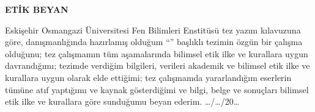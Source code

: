 \begin{center}
\Large\textbf{ETİK BEYAN}
\end{center}
\normalsize
\vspace{3cm}
\thispagestyle{empty}
Eskişehir Osmangazi Üniversitesi Fen Bilimleri Enstitüsü tez yazım kılavuzuna göre, \danisman\space danışmanlığında hazırlamış olduğum “\textbf{\tbaslik}” başlıklı tezimin özgün bir çalışma olduğunu; tez çalışmamın tüm aşamalarında bilimsel etik ilke ve kurallara uygun davrandığımı; tezimde verdiğim bilgileri, verileri akademik ve bilimsel etik ilke ve kurallara uygun olarak elde ettiğimi; tez çalışmamda yararlandığım eserlerin tümüne atıf yaptığımı ve kaynak gösterdiğimi ve bilgi, belge ve sonuçları bilimsel etik ilke ve kurallara göre sunduğumu beyan ederim.   …/…/20…
\vspace{3cm}

\begin{flushright}
\yazar
\end{flushright}
